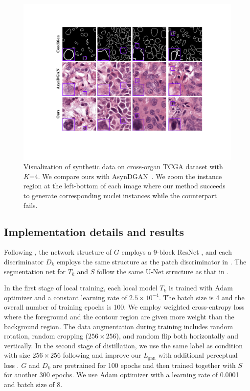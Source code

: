 \documentclass[letterpaper]{article} %
\begin{document}
\begin{figure}[h]
\centering
\includegraphics[width=\linewidth]{fig/sfig2.pdf}
\caption{Visualization of synthetic data on cross-organ TCGA dataset with $K$=4. We compare ours with AsynDGAN~\cite{chang2020synthetic}.  We zoom the instance region at the left-bottom of each image where our method succeeds to generate corresponding nuclei instances while the counterpart fails.
}
\label{fig:s2}
\end{figure}

\subsection{Implementation details and results}
Following \cite{chang2020synthetic}, the network structure of $G$ employs a 9-block ResNet \cite{he2016deep}, and each discriminator $D_k$ employs the same structure as the patch discriminator in \cite{isola2017image}. The segmentation net for $T_k$ and $S$ follow the same U-Net \cite{ronneberger2015u} structure as that in \cite{chang2020synthetic}.

In the first stage of local training, each local model $T_k$ is trained with Adam optimizer and a constant learning rate of $2.5\times10^{-4}$. The batch size is 4 and the overall number of training epochs is 100. We employ weighted cross-entropy loss where the foreground and the contour region are given more weight than the background region.
The data augmentation during training includes random rotation, random cropping ($256 \times 256$), and random flip both horizontally and vertically.
In the second stage of distillation, we use the same label as condition with size $256 \times 256$ following \cite{chang2020synthetic} and improve our $L_\text{gan}$ with additional perceptual loss \cite{johnson2016perceptual}. $G$ and $D_k$ are pretrained for 100 epochs and then trained together with $S$ for another 300 epochs. We use Adam optimizer with a learning rate of 0.0001 and batch size of 8.
\end{document}
